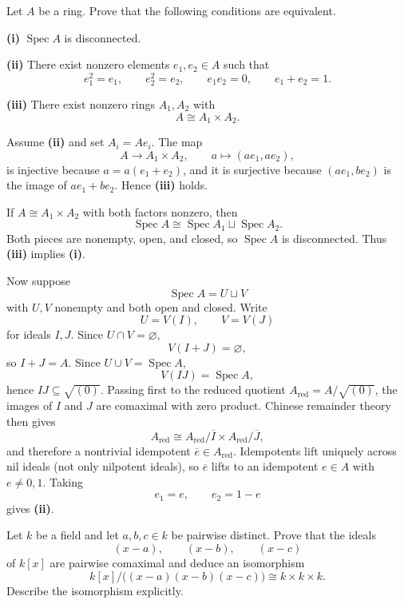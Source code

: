 \begin{problem}[CP-V-0003]
\label{prob:cp-v-0003}
Let \(A\) be a ring. Prove that the following conditions are equivalent.

\textbf{(i)} \(\operatorname{Spec}A\) is disconnected.

\textbf{(ii)} There exist nonzero elements \(e_1,e_2\in A\) such that
\[
e_1^2=e_1,\qquad e_2^2=e_2,\qquad e_1e_2=0,\qquad e_1+e_2=1.
\]

\textbf{(iii)} There exist nonzero rings \(A_1,A_2\) with
\[
A\cong A_1\times A_2.
\]
\end{problem}

\begin{solution}
Assume \textbf{(ii)} and set \(A_i=Ae_i\). The map
\[
A\longrightarrow A_1\times A_2,
\qquad
a\longmapsto(ae_1,ae_2),
\]
is injective because \(a=a(e_1+e_2)\), and it is surjective because
\((ae_1,be_2)\) is the image of \(ae_1+be_2\). Hence \textbf{(iii)} holds.

If \(A\cong A_1\times A_2\) with both factors nonzero, then
\[
\operatorname{Spec}A
\cong
\operatorname{Spec}A_1\sqcup\operatorname{Spec}A_2.
\]
Both pieces are nonempty, open, and closed, so \(\operatorname{Spec}A\) is
disconnected. Thus \textbf{(iii)} implies \textbf{(i)}.

Now suppose
\[
\operatorname{Spec}A=U\sqcup V
\]
with \(U,V\) nonempty and both open and closed. Write
\[
U=V(I),\qquad V=V(J)
\]
for ideals \(I,J\). Since \(U\cap V=\varnothing\),
\[
V(I+J)=\varnothing,
\]
so \(I+J=A\). Since \(U\cup V=\operatorname{Spec}A\),
\[
V(IJ)=\operatorname{Spec}A,
\]
hence \(IJ\subseteq\sqrt{(0)}\). Passing first to the reduced quotient
\(A_{\mathrm{red}}=A/\sqrt{(0)}\), the images of \(I\) and \(J\) are
comaximal with zero product. Chinese remainder theory then gives
\[
A_{\mathrm{red}}\cong A_{\mathrm{red}}/\overline I
\times A_{\mathrm{red}}/\overline J,
\]
and therefore a nontrivial idempotent \(\overline e\in A_{\mathrm{red}}\).
Idempotents lift uniquely across nil ideals (not only nilpotent ideals), so \(\overline e\) lifts
to an idempotent \(e\in A\) with \(e\ne0,1\). Taking
\[
e_1=e,\qquad e_2=1-e
\]
gives \textbf{(ii)}.
\end{solution}


\begin{problem}[CP-V-0008]
\label{prob:cp-v-0008}
Let \(k\) be a field and let \(a,b,c\in k\) be pairwise distinct. Prove that
the ideals
\[
(x-a),\qquad(x-b),\qquad(x-c)
\]
of \(k[x]\) are pairwise comaximal and deduce an isomorphism
\[
k[x]/\bigl((x-a)(x-b)(x-c)\bigr)
\cong
k\times k\times k.
\]
Describe the isomorphism explicitly.
\end{problem}

